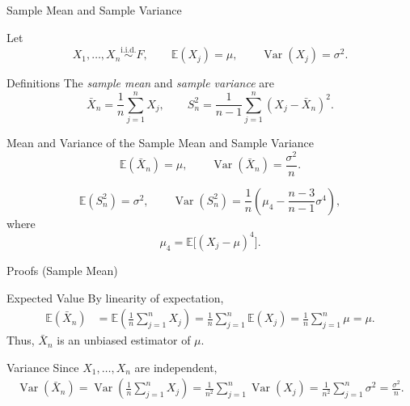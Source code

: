 \begin{frame}{Sample Mean and Sample Variance}

\small

Let
\[
X_1,\dots,X_n \overset{\text{i.i.d.}}{\sim} F,
\qquad 
\mathbb{E}(X_j)=\mu,
\qquad 
\operatorname{Var}(X_j)=\sigma^2.
\]

\begin{keybox}{Definitions}
The \emph{sample mean} and \emph{sample variance} are
\[
\bar X_n=\frac1n\sum_{j=1}^n X_j,
\qquad
S_n^2=\frac{1}{n-1}\sum_{j=1}^n (X_j-\bar X_n)^2.
\]
\end{keybox}

\begin{keybox}{Mean and Variance of the Sample Mean and Sample Variance}
\[
\mathbb{E}(\bar X_n)=\mu,
\qquad
\operatorname{Var}(\bar X_n)=\frac{\sigma^2}{n}.
\]

\[
\mathbb{E}(S_n^2)=\sigma^2,
\qquad
\operatorname{Var}(S_n^2)
=
\frac1n
\left(
\mu_4
-
\frac{n-3}{n-1}\sigma^4
\right),
\]
where
\[
\mu_4=\mathbb{E}\bigl[(X_j-\mu)^4\bigr].
\]
\end{keybox}

\end{frame}




\begin{frame}{Proofs (Sample Mean)}

\begin{keybox}{Expected Value}
By linearity of expectation,
\[
\begin{aligned}
\mathbb{E}(\bar X_n)
&=
\mathbb{E}\left(\frac1n\sum_{j=1}^n X_j\right)
=
\frac1n\sum_{j=1}^n \mathbb{E}(X_j)
=
\frac1n\sum_{j=1}^n \mu
=\mu.
\end{aligned}
\]
Thus, \(\bar X_n\) is an unbiased estimator of \(\mu\).
\end{keybox}

\begin{keybox}{Variance}
Since \(X_1,\dots,X_n\) are independent,
\[
\begin{aligned}
\operatorname{Var}(\bar X_n)
=
\operatorname{Var}\left(\frac1n\sum_{j=1}^n X_j\right)=
\frac1{n^2}\sum_{j=1}^n \operatorname{Var}(X_j)
=
\frac1{n^2}\sum_{j=1}^n \sigma^2=
\frac{\sigma^2}{n}.
\end{aligned}
\]
\end{keybox}

\end{frame}


